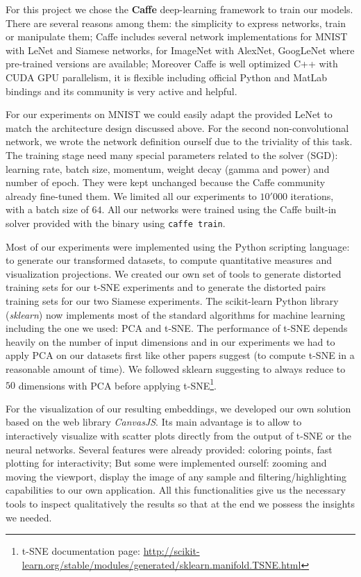 \documentclass[a4paper,12pt]{report}
\begin{document}
For this project we chose the {\bf Caffe} deep-learning framework to train our models.
There are several reasons among them: the simplicity to express networks, train or manipulate them; Caffe includes several network implementations for MNIST with LeNet and Siamese networks, for ImageNet with AlexNet, GoogLeNet where pre-trained versions are available; Moreover Caffe is well optimized C++ with CUDA GPU parallelism, it is flexible including official Python and MatLab bindings and its community is very active and helpful.

For our experiments on MNIST we could easily adapt the provided LeNet to match the architecture design discussed above.
For the second non-convolutional network, we wrote the network definition ourself due to the triviality of this task.
The training stage need many special parameters related to the solver (SGD): learning rate, batch size, momentum, weight decay (gamma and power) and number of epoch.
They were kept unchanged because the Caffe community already fine-tuned them.
We limited all our experiments to $10'000$ iterations, with a batch size of $64$.
All our networks were trained using the Caffe built-in solver provided with the binary using {\tt caffe train}.


Most of our experiments were implemented using the Python scripting language: to generate our transformed datasets, to compute quantitative measures and visualization projections.
We created our own set of tools to generate distorted training sets for our t-SNE experiments and to generate the distorted pairs training sets for our two Siamese experiments.
The scikit-learn Python library ({\em sklearn}) now implements most of the standard algorithms for machine learning including the one we used: PCA and t-SNE\cite{pedregosa2011scikit}.
The performance of t-SNE depends heavily on the number of input dimensions and in our experiments we had to apply PCA on our datasets first like other papers suggest\cite{t-SNE} (to compute t-SNE in a reasonable amount of time).
We followed sklearn suggesting to always reduce to $50$ dimensions with PCA before applying t-SNE\footnote{t-SNE documentation page: \url{http://scikit-learn.org/stable/modules/generated/sklearn.manifold.TSNE.html}}.

For the visualization of our resulting embeddings, we developed our own solution based on the web library {\em CanvasJS}.
Its main advantage is to allow to interactively visualize with scatter plots directly from the output of t-SNE or the neural networks.
Several features were already provided: coloring points, fast plotting for interactivity; But some were implemented ourself: zooming and moving the viewport, display the image of any sample and filtering/highlighting capabilities to our own application.
All this functionalities give us the necessary tools to inspect qualitatively the results so that at the end we possess the insights we needed.
\end{document}
